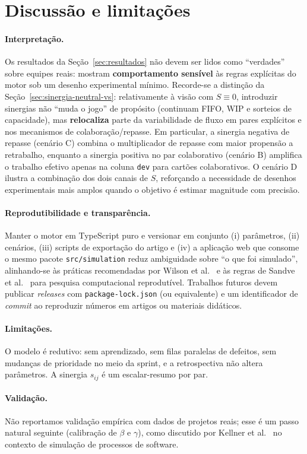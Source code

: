 \section{Discussão e limitações}
\label{sec:discussao}

\paragraph{Interpretação.}
Os resultados da Seção~\ref{sec:resultados} não devem ser lidos como ``verdades'' sobre equipes reais: mostram \textbf{comportamento sensível} às regras explícitas do motor sob um desenho experimental mínimo. Recorde-se a distinção da Seção~\ref{sec:sinergia-neutral-vs}: relativamente à visão com $S\equiv 0$, introduzir sinergias não ``muda o jogo'' de propósito (continuam FIFO, WIP e sorteios de capacidade), mas \textbf{relocaliza} parte da variabilidade de fluxo em pares explícitos e nos mecanismos de colaboração/repasse. Em particular, a sinergia negativa de repasse (cenário C) combina o multiplicador de repasse com maior propensão a retrabalho, enquanto a sinergia positiva no par colaborativo (cenário B) amplifica o trabalho efetivo apenas na coluna \texttt{dev} para cartões colaborativos. O cenário D ilustra a combinação dos dois canais de $S$, reforçando a necessidade de desenhos experimentais mais amplos quando o objetivo é estimar magnitude com precisão.

\paragraph{Reprodutibilidade e transparência.}
Manter o motor em TypeScript puro e versionar em conjunto (i) parâmetros, (ii) cenários, (iii) scripts de exportação do artigo e (iv) a aplicação web que consome o mesmo pacote \texttt{src/simulation} reduz ambiguidade sobre ``o que foi simulado'', alinhando-se às práticas recomendadas por Wilson et al.~\cite{wilson2017good} e às regras de Sandve et al.~\cite{sandve2013ten} para pesquisa computacional reprodutível. Trabalhos futuros devem publicar \emph{releases} com \texttt{package-lock.json} (ou equivalente) e um identificador de \emph{commit} ao reproduzir números em artigos ou materiais didáticos.

\paragraph{Limitações.}
O modelo é redutivo: sem aprendizado, sem filas paralelas de defeitos, sem mudanças de prioridade no meio da sprint, e a retrospectiva não altera parâmetros. A sinergia $s_{ij}$ é um escalar-resumo por par.

\paragraph{Validação.}
Não reportamos validação empírica com dados de projetos reais; esse é um passo natural seguinte (calibração de $\beta$ e $\gamma$), como discutido por Kellner et al.~\cite{kellner1999software} no contexto de simulação de processos de software.
